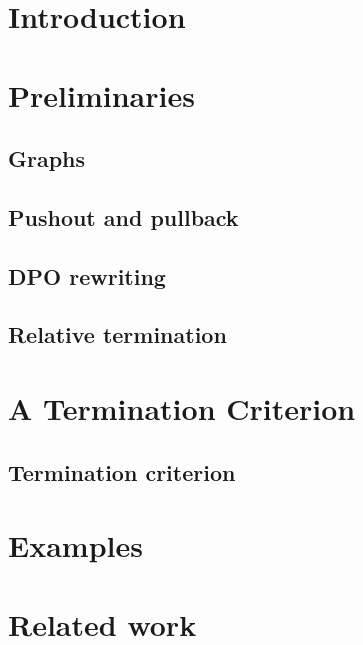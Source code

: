 \documentclass{book}
\begin{document}
\section{Introduction}
\label{sec:intro}

\section{Preliminaries} 
\label{sec:pre} 

\subsection{Graphs}
 
\subsection{Pushout and pullback}  


\subsection{DPO rewriting} 


\subsection{Relative termination}

   
\section{A Termination Criterion} 
\label{sec:termination_criterion}
 
 
\subsection{Termination criterion}
\label{sec:termination} 

 

\section{Examples}
\label{sec:examples}


  
\section{Related work}
\label{sec:related_work} 

\end{document}
